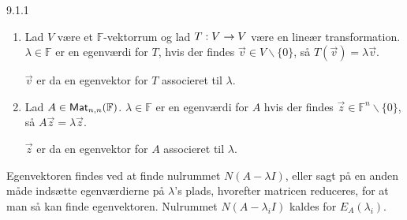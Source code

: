 \begin{definition}{9.1.1}
	\begin{enumerate}
		\item Lad $V$ være et $\mathbb{F}$-vektorrum og lad $T: V \rightarrow V$ være
			en lineær transformation.
			$\lambda \in \mathbb{F}$ er en egenværdi for $T$, hvis der findes
			$\vec{v} \in V \backslash \{0\}$, så $T(\vec{v}) = \lambda\vec{v}$. 
			
			$\vec{v}$ er da en egenvektor for $T$ associeret til $\lambda$.
		\item Lad $A \in \textsf{Mat}_{n,n}(\mathbb{F})$. $\lambda \in \mathbb{F}$ er 
			en egenværdi for $A$ hvis der findes $\vec{z} \in \mathbb{F}^n 
			\backslash \{0\}$, så $A\vec{z} = \lambda \vec{z}$.
			
			$\vec{z}$ er da en egenvektor for $A$ associeret til $\lambda$.
	\end{enumerate}
	Egenvektoren findes ved at finde nulrummet $N(A-\lambda I)$, eller sagt på
	en anden måde indsætte egenværdierne på $\lambda$'s plads, hvorefter 
	matricen reduceres, for at man så kan finde egenvektoren.
	Nulrummet $N(A-\lambda_i I)$ kaldes for $E_A(\lambda_i)$.
\end{definition}
